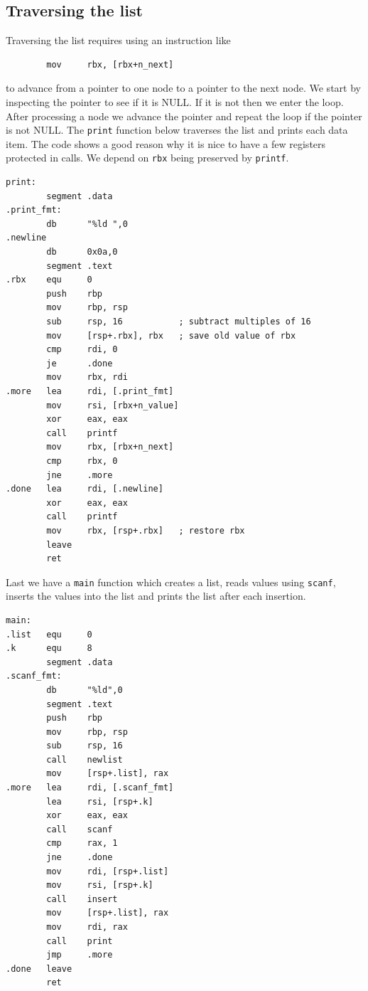 \documentclass[11pt,b5paper]{book}
\begin{document}
\subsection{Traversing the list}

Traversing the list requires using an instruction like
\begin{verbatim}
        mov     rbx, [rbx+n_next]
\end{verbatim}
to advance from a pointer to one node to a pointer to the next node.
We start by inspecting the pointer to see if it is NULL.
If it is not then we enter the loop.
After processing a node we advance the pointer and repeat the loop
if the pointer is not NULL.
The {\tt print} function below traverses the list and prints each
data item.
The code shows a good reason why it is nice to have a few registers
protected in calls.
We depend on {\tt rbx} being preserved by {\tt printf}.

\begin{verbatim}
print:
        segment .data
.print_fmt:
        db      "%ld ",0
.newline
        db      0x0a,0
        segment .text
.rbx    equ     0
        push    rbp
        mov     rbp, rsp
        sub     rsp, 16           ; subtract multiples of 16
        mov     [rsp+.rbx], rbx   ; save old value of rbx
        cmp     rdi, 0
        je      .done
        mov     rbx, rdi
.more   lea     rdi, [.print_fmt]
        mov     rsi, [rbx+n_value]
        xor     eax, eax
        call    printf
        mov     rbx, [rbx+n_next]
        cmp     rbx, 0
        jne     .more
.done   lea     rdi, [.newline]
        xor     eax, eax
        call    printf
        mov     rbx, [rsp+.rbx]   ; restore rbx
        leave
        ret
\end{verbatim}

Last we have a {\tt main} function which creates a list, reads values using {\tt scanf}, inserts the values into the list
and prints the list after each insertion.
\begin{verbatim}
main:
.list   equ     0
.k      equ     8
        segment .data
.scanf_fmt:
        db      "%ld",0
        segment .text
        push    rbp
        mov     rbp, rsp
        sub     rsp, 16
        call    newlist
        mov     [rsp+.list], rax
.more   lea     rdi, [.scanf_fmt]
        lea     rsi, [rsp+.k]
        xor     eax, eax
        call    scanf
        cmp     rax, 1
        jne     .done
        mov     rdi, [rsp+.list]
        mov     rsi, [rsp+.k]
        call    insert
        mov     [rsp+.list], rax
        mov     rdi, rax
        call    print
        jmp     .more
.done   leave
        ret
\end{verbatim}
\end{document}
